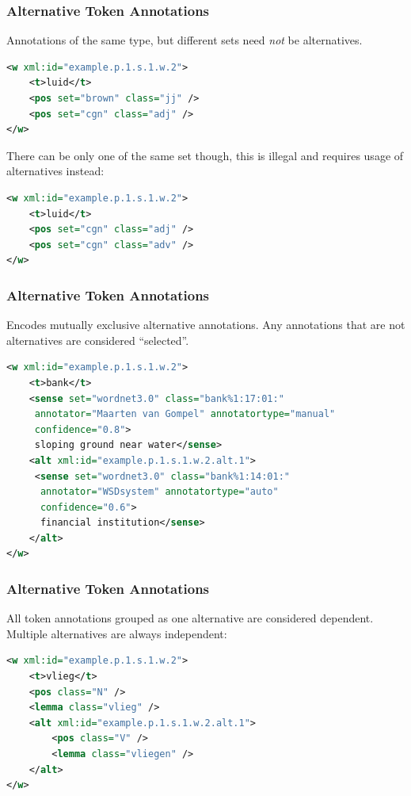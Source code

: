 \documentclass[compress,10pt]{beamer}
\begin{document}
\begin{frame}[fragile]
\frametitle{Alternative Token Annotations}

Annotations of the same type, but different sets need \emph{not} be alternatives.

\begin{lstlisting}[language=xml]
<w xml:id="example.p.1.s.1.w.2">
    <t>luid</t>
    <pos set="brown" class="jj" />
    <pos set="cgn" class="adj" />
</w>                         
\end{lstlisting}        

There can be only one of the same set though, this is illegal and requires usage of alternatives instead:

\begin{lstlisting}[language=xml]
<w xml:id="example.p.1.s.1.w.2">
    <t>luid</t>
    <pos set="cgn" class="adj" />
    <pos set="cgn" class="adv" />
</w>                         
\end{lstlisting}   

\end{frame}


\begin{frame}[fragile]
\frametitle{Alternative Token Annotations}

Encodes mutually exclusive alternative annotations. Any annotations that are not alternatives are considered ``selected''.

\begin{lstlisting}[language=xml]
<w xml:id="example.p.1.s.1.w.2">
    <t>bank</t>
    <sense set="wordnet3.0" class="bank%1:17:01:"    
     annotator="Maarten van Gompel" annotatortype="manual" 
     confidence="0.8">
     sloping ground near water</sense>
    <alt xml:id="example.p.1.s.1.w.2.alt.1">
     <sense set="wordnet3.0" class="bank%1:14:01:"
      annotator="WSDsystem" annotatortype="auto" 
      confidence="0.6">     
      financial institution</sense> 
    </alt>
</w>                         
\end{lstlisting}        

\end{frame}

\begin{frame}[fragile]
\frametitle{Alternative Token Annotations}

All token annotations grouped as one alternative are considered dependent. Multiple alternatives are always independent:

\begin{lstlisting}[language=xml]
<w xml:id="example.p.1.s.1.w.2">
    <t>vlieg</t>
    <pos class="N" />
    <lemma class="vlieg" />
    <alt xml:id="example.p.1.s.1.w.2.alt.1">
        <pos class="V" />
        <lemma class="vliegen" />
    </alt>
</w>                         
\end{lstlisting}        

\end{frame}
\end{document}
